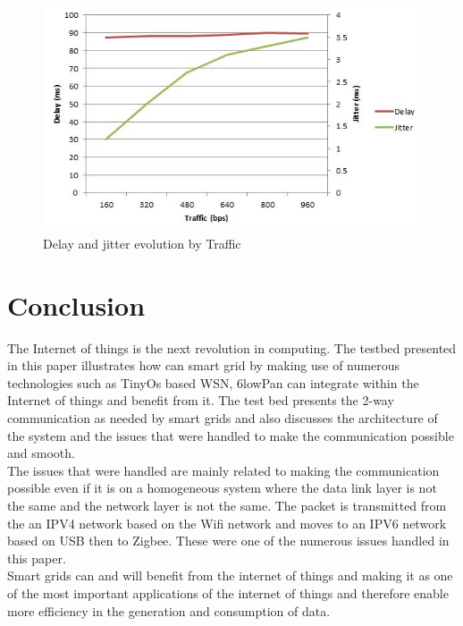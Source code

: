 \documentclass[conference]{IEEEtran}
\begin{document}
\begin{figure}[htbp]
\centering
\includegraphics[scale=0.6]{images/delay_jitter.JPG}
\caption{Delay and jitter evolution by Traffic}
\label{fig:delay_jitter}
\end{figure}

\section{Conclusion}
The Internet of things is the next revolution in computing. The testbed presented in this paper illustrates how can smart grid by making use of numerous technologies such as TinyOs based WSN, 6lowPan can integrate within the Internet of things and benefit from it. The test bed presents the 2-way communication as needed by smart grids and also discusses the architecture of the system and the issues that were handled to make the communication possible and smooth. \\
The issues that were handled are mainly related to making the communication possible even if it is on a homogeneous system where the data link layer is not the same and the network layer is not the same. The packet is transmitted from the an IPV4 network based on the Wifi network and moves to an IPV6 network based on USB then to Zigbee. These were one of the numerous issues handled in this paper. \\
Smart grids can and will benefit from the internet of things and making it as one of the most important applications of the internet of things and therefore enable more efficiency in the generation and consumption of data.

\mbox{}
\nocite{*}
 

     
\end{document}
